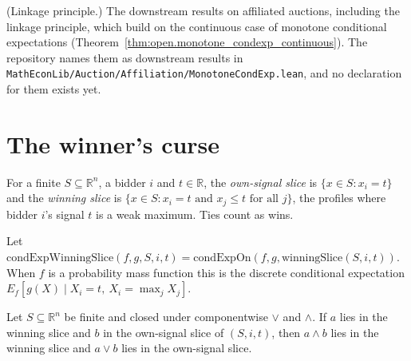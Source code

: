 \begin{theorem}\label{thm:open.linkage_principle}
(Linkage principle.) The downstream results on affiliated auctions, including the linkage principle, which build on the continuous case of monotone conditional expectations (Theorem~\ref{thm:open.monotone_condexp_continuous}). The repository names them as downstream results in \texttt{MathEconLib/Auction/Affiliation/MonotoneCondExp.lean}, and no declaration for them exists yet.
\end{theorem}

\section{The winner's curse}

\begin{definition}\label{def:MathEconLib.Auction.Affiliation.winningSlice}
\leanok
For a finite $S \subseteq \mathbb{R}^n$, a bidder $i$ and $t \in \mathbb{R}$, the \emph{own-signal slice} is $\{x \in S : x_i = t\}$ and the \emph{winning slice} is $\{x \in S : x_i = t \text{ and } x_j \le t \text{ for all } j\}$, the profiles where bidder $i$'s signal $t$ is a weak maximum. Ties count as wins.
\end{definition}

\begin{definition}\label{def:MathEconLib.Auction.Affiliation.condExpWinningSlice}
\leanok
{}
Let $\mathrm{condExpWinningSlice}(f, g, S, i, t) = \mathrm{condExpOn}(f, g, \mathrm{winningSlice}(S, i, t))$. When $f$ is a probability mass function this is the discrete conditional expectation $E_f[g(X) \mid X_i = t,\ X_i = \max_j X_j]$.
\end{definition}

\begin{lemma}\label{thm:MathEconLib.Auction.Affiliation.inf_mem_winningSlice}
\leanok
{}
Let $S \subseteq \mathbb{R}^n$ be finite and closed under componentwise $\vee$ and $\wedge$. If $a$ lies in the winning slice and $b$ in the own-signal slice of $(S, i, t)$, then $a \wedge b$ lies in the winning slice and $a \vee b$ lies in the own-signal slice.
\end{lemma}

